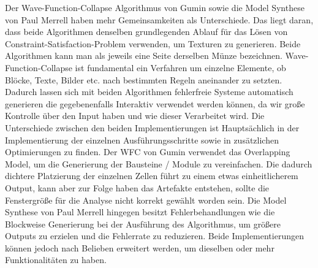 \documentclass[12pt, a4paper,twoside,openright]{report} %
\begin{document}
Der Wave-Function-Collapse Algorithmus von Gumin sowie die Model Synthese von Paul Merrell haben mehr Gemeinsamkeiten als Unterschiede.
Das liegt daran, dass beide Algorithmen denselben grundlegenden Ablauf für das Lösen von Constraint-Satisfaction-Problem verwenden, um Texturen zu generieren.
Beide Algorithmen kann man als jeweils eine Seite derselben Münze bezeichnen.
Wave-Function-Collapse ist fundamental  ein Verfahren um einzelne Elemente, ob Blöcke, Texte, Bilder etc. nach bestimmten Regeln aneinander zu setzten.
Dadurch lassen sich mit beiden Algorithmen fehlerfreie Systeme automatisch generieren die gegebenenfalls Interaktiv verwendet werden können,
da wir große Kontrolle über den Input haben und wie dieser Verarbeitet wird.
Die Unterschiede zwischen den beiden Implementierungen ist Hauptsächlich in der Implementierung der einzelnen Ausführungsschritte sowie in zusätzlichen Optimierungen zu finden.
Der WFC von Gumin verwendet das Overlapping Model, um die Generierung der Bausteine / Module zu vereinfachen.
Die dadurch dichtere Platzierung der einzelnen Zellen führt zu einem etwas einheitlicherem Output, kann aber zur Folge haben das Artefakte entstehen,
sollte die Fenstergröße für die Analyse nicht korrekt gewählt worden sein.
Die Model Synthese von Paul Merrell hingegen besitzt Fehlerbehandlungen wie die Blockweise Generierung bei der Ausführung des Algorithmus, um größere Outputs zu erzielen und die
Fehlerrate zu reduzieren.
Beide Implementierungen können jedoch nach Belieben erweitert werden, um dieselben oder mehr Funktionalitäten zu haben.

\printbibliography
\end{document}
